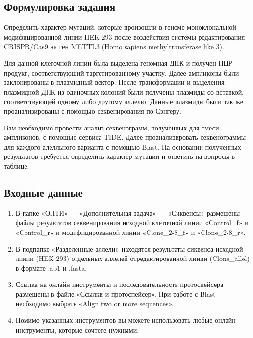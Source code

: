 
\subsection*{Формулировка задания}

Определить характер мутаций, которые произошли в геноме моноклональной модифицированной линии HEK 293 после воздействия системы редактирования CRISPR/Cas9 на ген METTL3 (Homo sapiens methyltransferase like 3).

Для данной клеточной линии была выделена геномная ДНК и получен ПЦР-продукт, соответствующий таргетированному участку. Далее ампликоны были заклонированы в плазмидный вектор. После трансформации и выделения плазмидной ДНК из одиночных колоний были получены плазмиды со вставкой, соответствующей одному либо другому аллелю. Данные плазмиды были так же проанализированы с помощью секвенирования по Сэнгеру.

Вам необходимо провести анализ секвенограмм, полученных для смеси ампликонов, с помощью сервиса TIDE. Далее проанализировать секвенограммы для каждого алелльного варианта с помощью Blast. На основании полученных результатов требуется определить характер мутации и ответить на вопросы в таблице.

\subsection*{Входные данные}

\begin{enumerate}
    \item В папке «ОНТИ» — «Дополнительная задача» — «Сиквенсы» размещены файлы результатов секвенирования исходной клеточной линии «Control\_f» и «Control\_r» и модифицированной линии «Clone\_2-8\_f» и «Clone\_2-8\_r».
    \item В подпапке «Разделенные аллели» находятся результаты сиквенса исходной линии (HEK 293) отдельных аллелей отредактированной линии (Clone\_allel) в формате .ab1 и .fasta.
    \item Ссылка на онлайн инструменты и последовательность протоспейсера размещены в файле «Ссылки и протоспейсер». При работе с Blast необходимо выбрать «Align two or more sequences».
    \item Помимо указанных инструментов вы можете использовать любые онлайн инструменты, которые сочтете нужными.
\end{enumerate}


